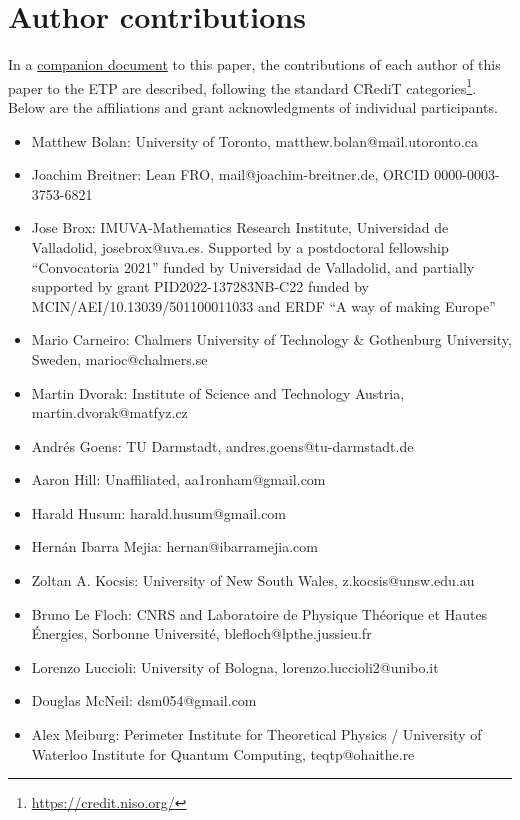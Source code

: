 \section{Author contributions}

In a \href{https://github.com/teorth/equational_theories/blob/main/paper/contributions.md}{companion document} to this paper, the contributions of each author of this paper to the ETP are described, following the standard CRediT categories\footnote{\url{https://credit.niso.org/}}.  Below are the affiliations and grant acknowledgments of individual participants.


\begin{itemize}
    \item Matthew Bolan: University of Toronto, matthew.bolan@mail.utoronto.ca
    \item Joachim Breitner: Lean FRO, mail@joachim-breitner.de, ORCID 0000-0003-3753-6821
    \item Jose Brox: IMUVA-Mathematics Research Institute, Universidad de Valladolid, josebrox@uva.es. Supported by a postdoctoral fellowship “Convocatoria 2021” funded by Universidad de Valladolid, and partially supported by grant PID2022-137283NB-C22 funded by MCIN/AEI/10.13039/501100011033 and ERDF “A way of making Europe”
    \item Mario Carneiro: Chalmers University of Technology \& Gothenburg University, Sweden, marioc@chalmers.se
    \item Martin Dvorak: Institute of Science and Technology Austria, martin.dvorak@matfyz.cz
    \item Andr\'es Goens: TU Darmstadt, andres.goens@tu-darmstadt.de
    \item Aaron Hill: Unaffiliated, aa1ronham@gmail.com
    \item Harald Husum: harald.husum@gmail.com
    \item Hern\'an Ibarra Mejia: hernan@ibarramejia.com
    \item Zoltan A. Kocsis: University of New South Wales, z.kocsis@unsw.edu.au
    \item Bruno Le Floch: CNRS and Laboratoire de Physique Th\'eorique et Hautes \'Energies, Sorbonne Universit\'e, blefloch@lpthe.jussieu.fr
    \item Lorenzo Luccioli: University of Bologna, lorenzo.luccioli2@unibo.it
    \item Douglas McNeil: dsm054@gmail.com
    \item Alex Meiburg: Perimeter Institute for Theoretical Physics / University of Waterloo Institute for Quantum Computing, teqtp@ohaithe.re

\end{itemize}
